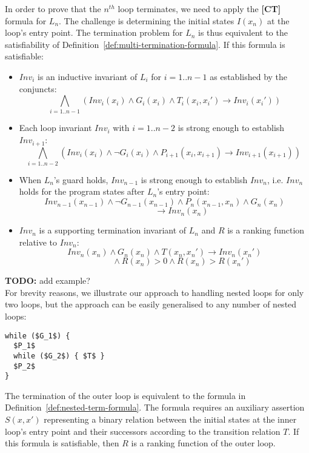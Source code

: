 \documentclass[preprint]{sigplanconf}
\theoremstyle{definition}
\newcommand{\todo}[1]{{\bf TODO:} #1}
\begin{document}
In order to prove that the $n^{th}$ loop terminates, we need to apply the {\bf [CT]} formula for $L_n$.
The challenge is determining the initial states  $I(x_n)$ at the loop's entry point.  
The termination problem for $L_n$ is thus equivalent to the satisfiability of
Definition~\ref{def:multi-termination-formula}.  If this formula is satisfiable:
\begin{itemize}
\item $Inv_i$ is an inductive invariant of $L_i$ for $i=1..{n-1}$ as established by the conjuncts:
$$\bigwedge_{i=1..n{-}1} (Inv_i(x_i) \wedge G_i(x_i) \wedge T_i(x_i, x_i') \rightarrow Inv_i(x_i')) $$

\item Each loop invariant $Inv_i$ with $i=1..{n-2}$ is strong enough to establish $Inv_{i+1}$:
$$\bigwedge_{i=1..n{-}2} (Inv_i(x_i) \wedge \lnot G_i(x_i) \wedge P_{i+1}(x_i, x_{i+1}) {\rightarrow} Inv_{i+1}(x_{i+1})) ~$$

\item When $L_n$'s guard holds, $Inv_{n-1}$ 
is strong enough to establish $Inv_n$, i.e. $Inv_n$ holds for the program states after $L_n$'s entry point:
$$ Inv_{n-1}(x_{n-1}) \wedge \lnot G_{n-1}(x_{n-1}) \wedge P_n(x_{n-1},x_n) \wedge G_n(x_n) $$
$$\qquad\qquad\rightarrow Inv_n(x_n)$$

\item $Inv_n$ is a supporting termination invariant of $L_n$ and $R$ is a ranking function relative to $Inv_n$:
$$Inv_n(x_n) \wedge G_n(x_n) \wedge T(x_n, x_n') \rightarrow Inv_n(x_n')$$
$$ \qquad \qquad \wedge R(x_n) > 0 \wedge R(x_n) > R(x_n')$$
\end{itemize}

\todo{add example?}\\

%
For brevity reasons, we illustrate our approach to handling nested loops for
only two loops, but the approach can be easily generalised to any number of
nested loops:
%
\begin{lstlisting}[mathescape=true]
while ($G_1$) { 
  $P_1$ 
  while ($G_2$) { $T$ }
  $P_2$
}
\end{lstlisting}

The termination of the outer loop is equivalent to the formula in
Definition~\ref{def:nested-term-formula}.  The formula requires an auxiliary
assertion $S(x,x')$ representing a binary relation between the initial
states at the inner loop's entry point and their successors according to the
transition relation $T$.  If this formula is satisfiable, then $R$ is a
ranking function of the outer loop.
\end{document}
